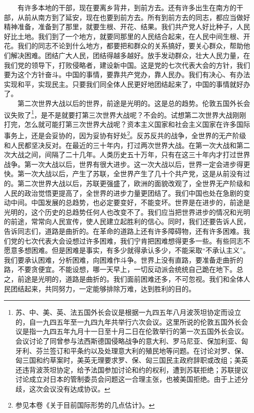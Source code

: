 \documentclass[cn,11pt,chinese]{elegantbook}
\begin{document}
　　有许多本地的干部，现在要离乡背井，到前方去。还有许多出生在南方的干部，从前从南方到了延安，现在也要到前方去。所有到前方去的同志，都应当做好精神准备，准备到了那里，就要生根、开花、结果。我们共产党人好比种子，人民好比土地。我们到了一个地方，就要同那里的人民结合起来，在人民中间生根、开花。我们的同志不论到什么地方，都要把和群众的关系搞好，要关心群众，帮助他们解决困难。团结广大人民，团结得越多越好。放手发动群众，壮大人民力量，在我们党的领导下，打败侵略者，建设新中国。这是党的七次代表大会的方针，我们要为这个方针奋斗。中国的事情，要靠共产党办，靠人民办。我们有决心、有办法实现和平，实现民主。只要我们同全体人民更好地团结起来了，中国的事情就好办了。\\
　　第二次世界大战以后的世界，前途是光明的。这是总的趋势。伦敦五国外长会议失败了\footnote[7]{ 苏、中、美、英、法五国外长会议是根据一九四五年八月波茨坦协定而设立的，自一九四五年至一九四九年共举行六次会议。这里所说的伦敦五国外长会议是指一九四五年九月十一日至十月二日在伦敦举行的第一次五国外长会议。会议讨论了同曾参与法西斯德国侵略战争的意大利、罗马尼亚、保加利亚、匈牙利、芬兰签订和平条约以及处理意大利的殖民地等问题。在讨论对罗、保、匈三国和约草案时，美英无理要求罗、保、匈三国民主政府辞职或改组；美英还违背波茨坦协定，给予法国参加讨论和约的权利，遭到苏联拒绝；苏联提议讨论成立对日本的管制委员会问题这一合理主张，也被美国拒绝。由于上述分歧，这次会议没有达成协议。}，是不是就要打第三次世界大战呢？不会的。试想第二次世界大战刚刚打完，怎么就可能打第三次世界大战呢？资本主义国家和社会主义国家在许多国际事务上，还是会妥协的，因为妥协有好处\footnote[8]{ 参见本卷《关于目前国际形势的几点估计》。}。反苏反共的战争，全世界的无产阶级和人民都坚决反对。在最近的三十年内，打过两次世界大战。在第一次大战和第二次大战之间，间隔了二十几年。人类历史五十万年，只有在这三十年内才打过世界战争。第一次大战以后，世界有很大进步。这一次大战以后，世界一定会进步得更快。第一次大战以后，产生了苏联，全世界产生了几十个共产党，这是从前没有过的。第二次世界大战以后，苏联更强盛了，欧洲的面貌改观了，全世界无产阶级和人民的政治觉悟更提高了，全世界的进步力量更团结了。我们中国也处在急剧的变动中间。中国发展的总趋势，也必定要变好，不能变坏。世界是在进步的，前途是光明的，这个历史的总趋势任何人也改变不了。我们应当把世界进步的情况和光明的前途，常常向人民宣传，使人民建立起胜利的信心。同时，我们还要告诉人民，告诉同志们，道路是曲折的。在革命的道路上还有许多障碍物，还有许多困难。我们党的七次代表大会设想过许多困难，我们宁肯把困难想得更多一些。有些同志不愿意多想困难。但是困难是事实，有多少就得承认多少，不能采取“不承认主义”。我们要承认困难，分析困难，向困难作斗争。世界上没有直路，要准备走曲折的路，不要贪便宜。不能设想，哪一天早上，一切反动派会统统自己跪在地下。总之，前途是光明的，道路是曲折的。我们面前困难还多，不可忽视。我们和全体人民团结起来，共同努力，一定能够排除万难，达到胜利的目的。\\
\end{document}
